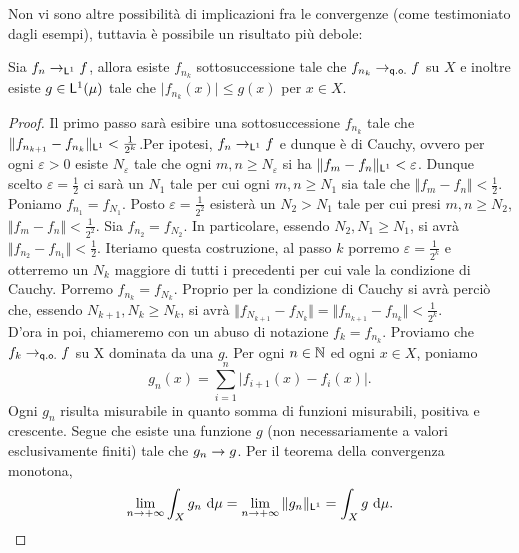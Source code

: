 \documentclass[Completo.tex]{subfiles}
\begin{document}
Non vi sono altre possibilità di implicazioni fra le convergenze (come testimoniato dagli esempi), tuttavia è possibile un risultato più debole:
\begin{eTh}
	Sia $f_n \ra_{\sf[L]^1} f$, allora esiste $f_{n_k}$ sottosuccessione tale che $f_{n_k} \ra_{\sf[q.o.]} f$ su $X$ e inoltre esiste $g \in \sf[L]^1(\mu)$ tale che $\vert f_{n_k}(x) \vert \leq g(x)$ per $x \in X$.
\end{eTh}
\begin{proof}
	Il primo passo sarà esibire una sottosuccessione $f_{n_k}$ tale che $\Vert f_{n_{k+1}} - f_{n_k} \Vert_{\sf[L]^1} < \frac{1}{2^k}$.Per ipotesi, $f_n \ra_{\sf[L]^1} f$ e dunque è di Cauchy, ovvero per ogni $\varepsilon > 0$ esiste $N_{\varepsilon}$ tale che ogni $m, n \geq N_{\varepsilon}$ si ha $\Vert f_m - f_n \Vert_{\sf[L]^1} < \varepsilon$. Dunque scelto $\varepsilon = \frac{1}{2}$ ci sarà un $N_1$ tale per cui ogni $m, n \geq N_1$ sia tale che $\Vert f_m - f_n \Vert < \frac{1}{2}$. Poniamo $f_{n_1} = f_{N_1}$. Posto $\varepsilon = \frac{1}{2^2}$ esisterà un $N_2 > N_1$ tale per cui presi $m, n \geq N_2$, $\Vert f_m - f_n \Vert < \frac{1}{2^2}$. Sia $f_{n_2} = f_{N_2}$. In particolare, essendo $N_2, N_1 \geq N_1$, si avrà $\Vert f_{n_2} - f_{n_1} \Vert < \frac{1}{2}$. Iteriamo questa costruzione, al passo $k$ porremo $\varepsilon = \frac{1}{2^k}$ e otterremo un $N_k$ maggiore di tutti i precedenti per cui vale la condizione di Cauchy. Porremo $f_{n_k} = f_{N_k}$. Proprio per la condizione di Cauchy si avrà perciò che, essendo $N_{k+1}, N_k \geq N_k$, si avrà $\Vert f_{N_{k+1}} - f_{N_k} \Vert = \Vert f_{n_{k+1}} - f_{n_k} \Vert < \frac{1}{2^k}$. \\
	D'ora in poi, chiameremo con un abuso di notazione $f_k = f_{n_k}$. Proviamo che $f_k \ra_{\sf[q.o.]} f$ su X dominata da una $g$. Per ogni $n \in \bb[N]$ ed ogni $x \in X$, poniamo
	\begin{equation*}
	g_n(x) = \sum_{i = 1}^{n} \vert f_{i+1}(x) - f_i(x) \vert.
	\end{equation*}
	Ogni $g_n$ risulta misurabile in quanto somma di funzioni misurabili, positiva e crescente. Segue che esiste una funzione $g$ (non necessariamente a valori esclusivamente finiti) tale che $g_n \rightarrow g$. Per il teorema della convergenza monotona,
	\begin{equation*}
	\lim_{n \ra +\infty} \int_X g_n \ \mathrm{d}\mu = \lim_{n \ra +\infty} \Vert g_n \Vert_{\sf[L]^1} = \int_X g \ \mathrm{d}\mu.
	\end{equation*}

\end{proof}
\end{document}
